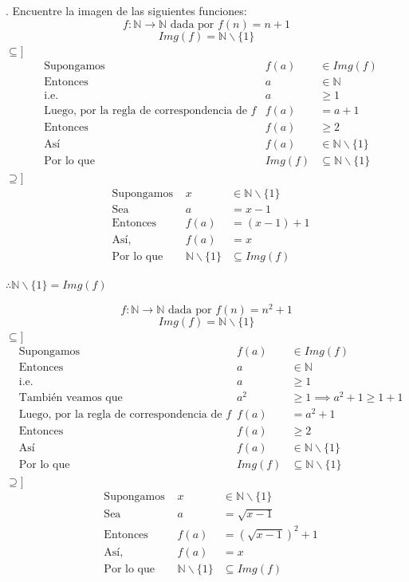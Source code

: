 \documentclass[letterpaper]{article}
\newcommand{\N}{\mathds{N}}
\renewcommand{\*}{\cdot}
\theoremstyle{definition}
\begin{document}
. Encuentre la imagen de las siguientes funciones:
\[ f : \N \to \N  \text{ dada por } f(n) = n + 1  \]
\[  Img(f) = \N\backslash\{ 1 \}\]
$ \subseteq] $
\begin{align*}
	&\text{Supongamos }	& f(a) &\in Img(f) \\
	&\text{Entonces }	& a &\in \N \\
	&\text{i.e. }	& a &\geq 1 \\
	&\text{Luego, por la regla de correspondencia de  }f	& f(a) &= a + 1 \\
	&\text{Entonces  }	& f(a) &\geq 2\\
	&\text{Así  }	& f(a) &\in  \N\backslash\{ 1 \}\\
	&\text{Por lo que  }	& Img(f) &\subseteq  \N\backslash\{ 1 \}
\end{align*}
$ \supseteq] $
\begin{align*}
	&\text{Supongamos }	& x &\in \N\backslash\{ 1 \} \\
	&\text{Sea }	& a &= x - 1 \\
	&\text{Entonces }	& f(a) &= (x - 1) + 1 \\
	&\text{Así,  }	& f(a) &= x\\
	&\text{Por lo que  }	& \N\backslash\{ 1 \} &\subseteq Img(f)
\end{align*}
\begin{center}
	$ \therefore \N\backslash\{ 1 \} = Img(f) $
\end{center}
\[ f : \N \to \N \text{ dada por } f(n) = n^2 + 1  \]
\[  Img(f) = \N\backslash\{ 1 \}\]
$ \subseteq] $
\begin{align*}
&\text{Supongamos }	& f(a) &\in Img(f) \\
&\text{Entonces }	& a &\in \N \\
&\text{i.e. }	& a &\geq 1 \\
&\text{También veamos que }	& a^2 &\geq 1 \implies a^2 + 1 \geq 1 + 1  \\
&\text{Luego, por la regla de correspondencia de  }f	& f(a) &= a^2 + 1 \\
&\text{Entonces  }	& f(a) &\geq 2\\
&\text{Así  }	& f(a) &\in  \N\backslash\{ 1 \}\\
&\text{Por lo que  }	& Img(f) &\subseteq  \N\backslash\{ 1 \}
\end{align*}
$ \supseteq] $
\begin{align*}
&\text{Supongamos }	& x &\in \N\backslash\{ 1 \} \\
&\text{Sea }	& a &= \sqrt{x - 1} \\
&\text{Entonces }	& f(a) &= (\sqrt{x - 1})^2 + 1 \\
&\text{Así,  }	& f(a) &= x\\
&\text{Por lo que  }	& \N\backslash\{ 1 \} &\subseteq Img(f)
\end{align*}
\end{document}
